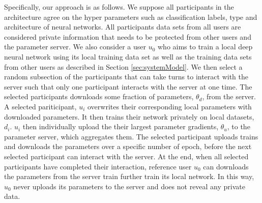 \documentclass[conference]{IEEEtran}
\begin{document}
Specifically, our approach is as follows. We suppose all participants in the architecture agree on the hyper parameters such as classification labels, type and architecture of neural networks.
All participants data sets from all users are considered private information that needs to be protected from other users and the parameter server. We also consider a user $u_0$ who aims to train a local deep neural network using its local training data set as well as the training data sets from other users as described in Section \ref{sec:systemModel}. 
We then select a random subsection of the participants that can take turns to interact with the server such that only one participant interacts with the server at one time. The selected participants downloads some fraction of parameters, $\theta_d$, from the server. A selected pariticipant, $u_i$  overwrites their corresponding local parameters with downloaded parameters. It then trains their network privately on local datasets, $d_i$. $u_i$ then individually upload the their largest parameter gradients, $\theta_u$,  to the parameter server, which aggregates them.
The selected participant uploads trains and downloads the parameters over a specific number of epoch, before the next selected participant can interact with the server.
At the end, when all selected participants have completed their interaction, reference user $u_0$ can downloads the parameters from the server train further train its local network. In this way, $u_0$ never uploads its parameters to the server and does not reveal any private data. 
\end{document}
